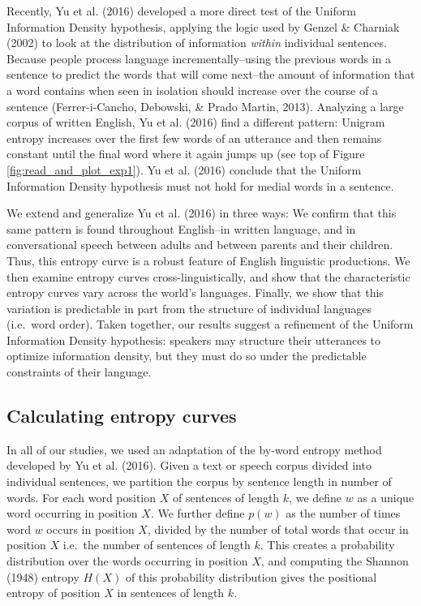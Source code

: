 \documentclass[10pt, letterpaper]{article}
\begin{document}
Recently, Yu et al. (2016) developed a more direct test of the Uniform
Information Density hypothesis, applying the logic used by Genzel \&
Charniak (2002) to look at the distribution of information \emph{within}
individual sentences. Because people process language
incrementally--using the previous words in a sentence to predict the
words that will come next--the amount of information that a word
contains when seen in isolation should increase over the course of a
sentence (Ferrer-i-Cancho, Debowski, \& Prado Martin, 2013). Analyzing a
large corpus of written English, Yu et al. (2016) find a different
pattern: Unigram entropy increases over the first few words of an
utterance and then remains constant until the final word where it again
jumps up (see top of Figure \ref{fig:read_and_plot_exp1}). Yu et al.
(2016) conclude that the Uniform Information Density hypothesis must not
hold for medial words in a sentence.

We extend and generalize Yu et al. (2016) in three ways: We confirm that
this same pattern is found throughout English--in written language, and
in conversational speech between adults and between parents and their
children. Thus, this entropy curve is a robust feature of English
linguistic productions. We then examine entropy curves
cross-linguistically, and show that the characteristic entropy curves
vary across the world's languages. Finally, we show that this variation
is predictable in part from the structure of individual languages
(i.e.~word order). Taken together, our results suggest a refinement of
the Uniform Information Density hypothesis: speakers may structure their
utterances to optimize information density, but they must do so under
the predictable constraints of their language.

\hypertarget{calculating-entropy-curves}{%
\subsection{Calculating entropy
curves}\label{calculating-entropy-curves}}

In all of our studies, we used an adaptation of the by-word entropy
method developed by Yu et al. (2016). Given a text or speech corpus
divided into individual sentences, we partition the corpus by sentence
length in number of words. For each word position \(X\) of sentences of
length \(k\), we define \(w\) as a unique word occurring in position
\(X\). We further define \(p(w)\) as the number of times word \(w\)
occurs in position \(X\), divided by the number of total words that
occur in position \(X\) i.e.~the number of sentences of length \(k\).
This creates a probability distribution over the words occurring in
position \(X\), and computing the Shannon (1948) entropy \(H(X)\) of
this probability distribution gives the positional entropy of position
\(X\) in sentences of length \(k\).
\end{document}
